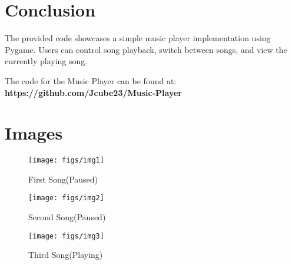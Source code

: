\documentclass[journal,12pt,twocolumn]{IEEEtran}
\begin{document}
\section{Conclusion}
The provided code showcases a simple music player implementation using Pygame.
Users can control song playback, switch between songs, and view the currently playing song.

The code for the Music Player can be found at:
\textbf{https://github.com/Jcube23/Music-Player}
\section{Images}
\begin{figure}[h!]
        \texttt{[image: figs/img1]}
        \caption{First Song(Paused)}
        \label{fig:1}
\end{figure}

\begin{figure}[h!]
        \texttt{[image: figs/img2]}
        \caption{Second Song(Paused)}
        \label{fig:2}
\end{figure}

\begin{figure}[h!]
       \texttt{[image: figs/img3]}
        \caption{Third Song(Playing)}
        \label{fig:3}
\end{figure}
\end{document}
